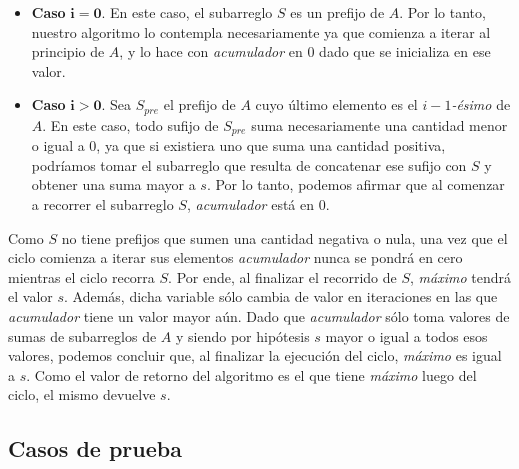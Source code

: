 \begin{itemize}
    \item \textbf{Caso} $\mathbf{i = 0}$. En este caso, el subarreglo $S$ es un prefijo de $A$. Por lo tanto, nuestro algoritmo lo contempla necesariamente ya que comienza a iterar al principio de $A$, y lo hace con \textit{acumulador} en $0$ dado que se inicializa en ese valor.

    \item \textbf{Caso} $\mathbf{i > 0}$. Sea $S_{pre}$ el prefijo de $A$ cuyo último elemento es el $i-1$\textit{-ésimo} de $A$. En este caso, todo sufijo de $S_{pre}$ suma necesariamente una cantidad menor o igual a $0$, ya que si existiera uno que suma una cantidad positiva, podríamos tomar el subarreglo que resulta de concatenar ese sufijo con $S$ y obtener una suma mayor a $s$. Por lo tanto, podemos afirmar que al comenzar a recorrer el subarreglo $S$, \textit{acumulador} está en $0$.
\end{itemize}

Como $S$ no tiene prefijos que sumen una cantidad negativa o nula, una vez que el ciclo comienza a iterar sus elementos \textit{acumulador} nunca se pondrá en cero mientras el ciclo recorra $S$. Por ende, al finalizar el recorrido de $S$, \textit{máximo} tendrá el valor $s$. Además, dicha variable sólo cambia de valor en iteraciones en las que \textit{acumulador} tiene un valor mayor aún. Dado que \textit{acumulador} sólo toma valores de sumas de subarreglos de $A$ y siendo por hipótesis $s$ mayor o igual a todos esos valores, podemos concluir que, al finalizar la ejecución del ciclo, \textit{máximo} es igual a $s$. Como el valor de retorno del algoritmo es el que tiene \textit{máximo} luego del ciclo, el mismo devuelve $s$.

\subsection{Casos de prueba}
